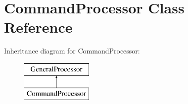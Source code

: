 \hypertarget{classCommandProcessor}{\section{Command\-Processor Class Reference}
\label{classCommandProcessor}
}
Inheritance diagram for Command\-Processor\-:\begin{figure}[H]
\begin{center}
\leavevmode
\includegraphics[height=2.000000cm]{classCommandProcessor}
\end{center}
\end{figure}

